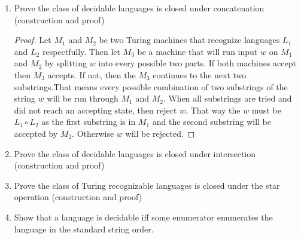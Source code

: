 \documentclass{article}
\begin{document}
\begin{enumerate}
\begin{proof}
            Let $M_1$ and $M_2$ be two Turing machines that recognize languages $L_1$ and $L_2$
            respectfully. Then let $M_3$ be a machine that will run input $w$ alternately between 
            machines $M_1$ and $M_2$. If a machine accepts, $M_3$ accepts. If both 
            machines reject then $M_3$ rejects. As $w\in L_1\cup L_2$, the string can be $w\in L_1$,
            then the $M_1$ portions of $M_3$ will accept it. If the string is $w\in L_2$, then the
            $M_2$ portions of $M_3$ will accept it. If the string is $w\not\in L_1\cup L_2$ then 
            $w\not\in L_1$ and $w\not\in L_2$ and so $M_3$ will not accept $w$. Therefore $M_3$ 
            recognizes $L_1\cup L_2$.
        \end{proof}
        \item Prove the class of decidable languages is closed under concatenation (construction 
        and proof)
        \begin{proof}
            Let $M_1$ and $M_2$ be two Turing machines that recognize languages $L_1$ and $L_2$
            respectfully. Then let $M_3$ be a machine that will run input $w$ on $M_1$ and $M_2$
            by splitting $w$ into every possible two parts. If both machines accept then $M_3$ 
            accepts. If not, then the $M_3$ continues to the next two substrings.That means every 
            possible combination of two substrings of the string $w$ will be run through $M_1$ 
            and $M_2$. When all substrings are tried and did not reach an accepting state, then 
            reject $w$. That way the $w$ must be $L_1\circ L_2$ as the first substring is in 
            $M_1$ and the second substring will be accepted by $M_2$. Otherwise $w$ will be rejected.
        \end{proof}
        \item Prove the class of decidable languages is closed under intersection (construction 
        and proof)
        \item Prove the class of Turing recognizable languages is closed under the star operation 
        (construction and proof)
        \item Show that a language is decidable iff some enumerator enumerates the language in
        the standard string order.
    \end{enumerate}
\end{document}
